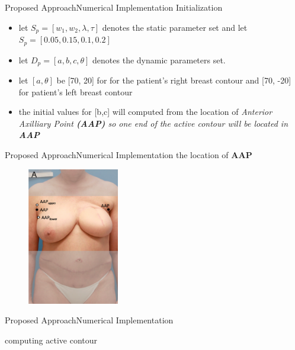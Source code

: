 \documentclass[10pt]{beamer}
\begin{document}
\begin{frame}{Proposed Approach}{Numerical Implementation} 
Initialization
\begin{itemize}
	\item let $S_{p}=[w_{1},w_{2},\lambda,\tau]$ denotes the static parameter set and let $S_{p} = [0.05, 0.15, 0.1, 0.2]$
	\item let $D_{p}=[a, b, c, \theta]$ denotes the dynamic parameters set.
	\item let $[a,\theta]$ be [70, 20] for for the patient's right breast contour and [70, -20] for patient's left breast contour
	\item the initial values for [b,c] will computed from the location of \em Anterior Axilliary Point \textbf{(AAP)} so one end of the active contour will be located in \textbf{AAP}
\end{itemize}
\end{frame}

\begin{frame}{Proposed Approach}{Numerical Implementation} 
the location of \textbf{AAP}
\begin{figure}[t]
	\includegraphics[width=4cm]{Feathergraphics/fig1A}
	\centering
\end{figure}
\end{frame}

\begin{frame}{Proposed Approach}{Numerical Implementation} 
\begin{algorithm}[H]
	\caption{computing active contour}
\end{algorithm}
\end{frame}
\end{document}
